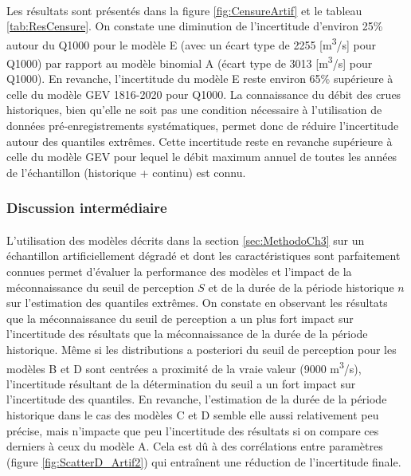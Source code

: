 \documentclass[11pt]{article}
\begin{document}
	\paragraph{}
	Les résultats sont présentés dans la figure \ref{fig:CensureArtif} et le tableau \ref{tab:ResCensure}. On constate une diminution de l'incertitude d'environ 25\% autour du Q1000 pour le modèle E (avec un écart type de 2255 [m\textsuperscript{3}/s] pour Q1000) par rapport au modèle binomial A (écart type de 3013 [m\textsuperscript{3}/s] pour Q1000). En revanche, l'incertitude du modèle E reste environ 65\% supérieure à celle du modèle GEV 1816-2020 pour Q1000. La connaissance du débit des crues historiques, bien qu'elle ne soit pas une condition nécessaire à l'utilisation de données pré-enregistrements systématiques, permet donc de réduire l'incertitude autour des quantiles extrêmes. Cette incertitude reste en revanche supérieure à celle du modèle GEV pour lequel le débit maximum annuel de toutes les années de l'échantillon (historique + continu) est connu.	

	\subsubsection{Discussion intermédiaire}
	
	\paragraph{} L'utilisation des modèles décrits dans la section \ref{sec:MethodoCh3} sur un échantillon artificiellement dégradé et dont les caractéristiques sont parfaitement connues permet d'évaluer la performance des modèles et l'impact de la méconnaissance du seuil de perception $S$ et de la durée de la période historique $n$ sur l'estimation des quantiles extrêmes. On constate en observant les résultats que la méconnaissance du seuil de perception a un plus fort impact sur l'incertitude des résultats que la méconnaissance de la durée de la période historique. Même si les distributions a posteriori du seuil de perception pour les modèles B et D sont centrées a proximité de la vraie valeur (9000 m\textsuperscript{3}/s), l'incertitude résultant de la détermination du seuil a un fort impact sur l'incertitude des quantiles. En revanche, l'estimation de la durée de la période historique dans le cas des modèles C et D semble elle aussi relativement peu précise, mais n'impacte que peu l'incertitude des résultats si on compare ces derniers à ceux du modèle A. Cela est dû à des corrélations entre paramètres (figure \ref{fig:ScatterD_Artif2}) qui entraînent une réduction de l'incertitude finale.
	 
\end{document}

